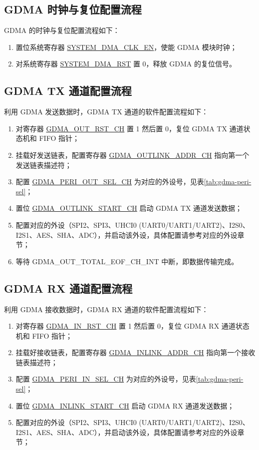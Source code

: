 \documentclass[main\_\_CN.tex]{subfiles}
\begin{document}
\subsection{GDMA 时钟与复位配置流程}
GDMA 的时钟与复位配置流程如下：
\begin{enumerate}
    \item 置位系统寄存器 \hyperref[fielddesc:SYSTEMDMACLKEN]{SYSTEM\_DMA\_CLK\_EN}，使能 GDMA 模块时钟；
    \item 对系统寄存器 \hyperref[fielddesc:SYSTEMDMARST]{SYSTEM\_DMA\_RST} 置 0，释放 GDMA 的复位信号。
\end{enumerate}

\subsection{GDMA TX 通道配置流程}
利用 GDMA 发送数据时，GDMA TX 通道的软件配置流程如下：
\begin{enumerate}
    \item 对寄存器 \hyperref[fielddesc:DMAOUTRSTCHN]{GDMA\_OUT\_RST\_CH} 置 1 然后置 0，复位 GDMA TX 通道状态机和 FIFO 指针；
    \item 挂载好发送链表，配置寄存器 \hyperref[fielddesc:DMAOUTLINKADDRCHN]{GDMA\_OUTLINK\_ADDR\_CH} 指向第一个发送链表描述符；
    \item 配置 \hyperref[fielddesc:DMAPERIOUTSELCHN]{GDMA\_PERI\_OUT\_SEL\_CH} 为对应的外设号，见表\ref{tab:gdma-peri-sel}；
    \item 置位 \hyperref[fielddesc:DMAOUTLINKSTARTCHN]{GDMA\_OUTLINK\_START\_CH} 启动 GDMA TX 通道发送数据；
    \item 配置对应的外设（SPI2、SPI3、UHCI0 (UART0/UART1/UART2)、I2S0、I2S1、AES、SHA、ADC），并启动该外设，具体配置请参考对应的外设章节；
    \item 等待 GDMA\_OUT\_TOTAL\_EOF\_CH\_INT 中断，即数据传输完成。
\end{enumerate}

\subsection{GDMA RX 通道配置流程}
利用 GDMA 接收数据时，GDMA RX 通道的软件配置流程如下：
\begin{enumerate}
    \item 对寄存器 \hyperref[fielddesc:DMAINRSTCHN]{GDMA\_IN\_RST\_CH} 置 1 然后置 0，复位 GDMA RX 通道状态机和 FIFO 指针；
    \item 挂载好接收链表，配置寄存器 \hyperref[fielddesc:DMAINLINKADDRCHN]{GDMA\_INLINK\_ADDR\_CH} 指向第一个接收链表描述符；
    \item 配置 \hyperref[fielddesc:DMAPERIINSELCHN]{GDMA\_PERI\_IN\_SEL\_CH} 为对应的外设号，见表\ref{tab:gdma-peri-sel}；
    \item 置位 \hyperref[fielddesc:DMAINLINKSTARTCHN]{GDMA\_INLINK\_START\_CH} 启动 GDMA RX 通道发送数据；
    \item 配置对应的外设（SPI2、SPI3、UHCI0 (UART0/UART1/UART2)、I2S0、I2S1、AES、SHA、ADC），并启动该外设，具体配置请参考对应的外设章节；
\end{enumerate}
\end{document}
